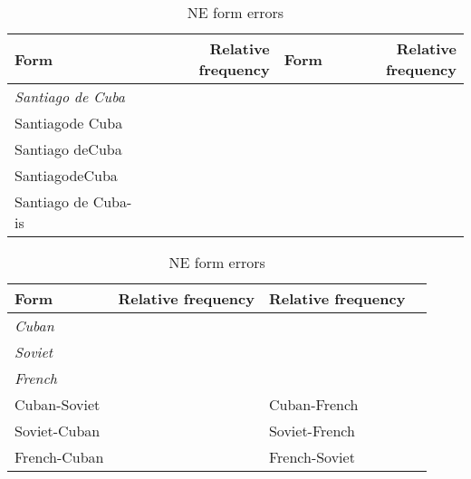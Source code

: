 \begin{table}
\centering
\caption{NE form errors}
\begin{tabular}{l r | l r }\toprule
 \textbf{Form} & \textbf{Relative frequency} & \textbf{Form} & \textbf{Relative frequency} \\
\midrule
\emph{Santiago de Cuba} & & & \\
\midrule
Santiagode Cuba & & & \\
Santiago deCuba & & & \\
SantiagodeCuba & & &\\
Santiago de Cuba-is & & &\\
\bottomrule
\end{tabular}
\end{table}

\begin{table}
\centering
\caption{NE form errors}
\begin{tabular}{l r | l r }\toprule
 \textbf{Form} & \textbf{Relative frequency} & \textbf{Relative frequency} \\
\midrule
\multicolumn{2}{l}{\emph{Cuban}} & \multicolumn{2}{r}{}\\
\multicolumn{2}{l}{\emph{Soviet}} & \multicolumn{2}{r}{}\\
\multicolumn{2}{l}{\emph{French}} & \multicolumn{2}{r}{}\\
\midrule
Cuban-Soviet & & Cuban-French & \\
Soviet-Cuban & & Soviet-French & \\
French-Cuban & & French-Soviet & \\
\bottomrule
\end{tabular}
\end{table}
